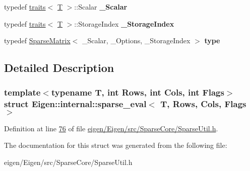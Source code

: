 \begin{DoxyCompactItemize}
\item 
\mbox{\label{struct_eigen_1_1internal_1_1sparse__eval_aa7ec65e247c09cc782737dd1b917c746}} 
typedef \hyperlink{struct_eigen_1_1internal_1_1traits}{traits}$<$ \hyperlink{group___sparse_core___module}{T} $>$\+::Scalar {\bfseries \+\_\+\+Scalar}
\item 
\mbox{\label{struct_eigen_1_1internal_1_1sparse__eval_a83ac96d9391f27e971a99878d9480258}} 
typedef \hyperlink{struct_eigen_1_1internal_1_1traits}{traits}$<$ \hyperlink{group___sparse_core___module}{T} $>$\+::Storage\+Index {\bfseries \+\_\+\+Storage\+Index}
\item 
\mbox{\label{struct_eigen_1_1internal_1_1sparse__eval_aff5f6f9f14505af5bbb191f469749a84}} 
typedef \hyperlink{group___sparse_core___module_class_eigen_1_1_sparse_matrix}{Sparse\+Matrix}$<$ \+\_\+\+Scalar, \+\_\+\+Options, \+\_\+\+Storage\+Index $>$ {\bfseries type}
\end{DoxyCompactItemize}


\subsection{Detailed Description}
\subsubsection*{template$<$typename T, int Rows, int Cols, int Flags$>$\newline
struct Eigen\+::internal\+::sparse\+\_\+eval$<$ T, Rows, Cols, Flags $>$}



Definition at line \hyperlink{eigen_2_eigen_2src_2_sparse_core_2_sparse_util_8h_source_l00076}{76} of file \hyperlink{eigen_2_eigen_2src_2_sparse_core_2_sparse_util_8h_source}{eigen/\+Eigen/src/\+Sparse\+Core/\+Sparse\+Util.\+h}.



The documentation for this struct was generated from the following file\+:\begin{DoxyCompactItemize}
\item 
eigen/\+Eigen/src/\+Sparse\+Core/\+Sparse\+Util.\+h\end{DoxyCompactItemize}
